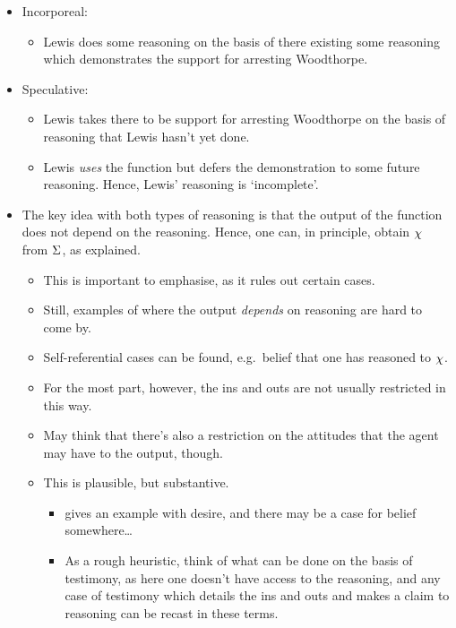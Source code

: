 \documentclass[10pt]{article}
\begin{document}
\begin{itemize}
\item Incorporeal:
  \begin{itemize}
  \item Lewis does some reasoning on the basis of there existing some reasoning which demonstrates the support for arresting Woodthorpe.
  \end{itemize}
\item Speculative:
  \begin{itemize}
  \item Lewis takes there to be support for arresting Woodthorpe on the basis of reasoning that Lewis hasn't yet done.
  \item Lewis \emph{uses} the function but defers the demonstration to some future reasoning.
    Hence, Lewis' reasoning is `incomplete'.
  \end{itemize}
\item The key idea with both types of reasoning is that the output of the function does not depend on the reasoning.
  Hence, one can, in principle, obtain \(\chi\) from \(\Sigma\), as explained.
  \begin{itemize}
  \item This is important to emphasise, as it rules out certain cases.
  \item Still, examples of where the output \emph{depends} on reasoning are hard to come by.
  \item Self-referential cases can be found, e.g.\ belief that one has reasoned to \(\chi\).
  \item For the most part, however, the ins and outs are not usually restricted in this way.
  \item May think that there's also a restriction on the attitudes that the agent may have to the output, though.
  \item This is plausible, but substantive.
    \begin{itemize}
    \item \citeauthor{Sinhababu:2017aa} gives an example with desire, and there may be a case for belief somewhere\dots
    \item As a rough heuristic, think of what can be done on the basis of testimony, as here one doesn't have access to the reasoning, and any case of testimony which details the ins and outs and makes a claim to reasoning can be recast in these terms.
    \end{itemize}
  \end{itemize}
\end{itemize}
\end{document}
